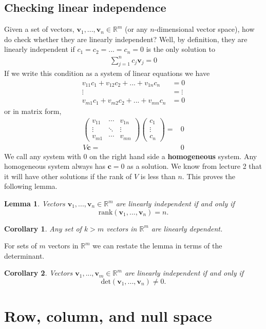 \documentclass[12pt,reqno]{amsart}
\newtheorem{corollary}{Corollary}[section]
\newtheorem{lemma}{Lemma}[section]
\theoremstyle{definition}
\def\R{\mathbb{R}}
\newcommand{\gmatrix}[1]{\begin{pmatrix} {#1}_{11} & \cdots &
    {#1}_{1n} \\ \vdots & \ddots & \vdots \\ {#1}_{m1} & \cdots &
    {#1}_{mn} \end{pmatrix}}
\renewcommand{\det}{\mathrm{det}}
\newcommand{\rank}{\mathrm{rank}}
\begin{document}
\subsection{Checking linear independence}
Given a set of vectors, $\mathbf{v}_1, ..., \mathbf{v}_n \in \R^m$ (or
any $n$-dimensional vector space), how do check whether they are
linearly independent? Well, by definition, they are linearly
independent if $c_1 = c_2 = ... = c_n = 0$ is the only solution to
\begin{align*}
  \sum_{j=1}^n c_j \mathbf{v}_j = 0 
\end{align*}
If we write this condition as a system of linear equations we have
\begin{align*}
  v_{11} c_1 + v_{12} c_2 + ... + v_{1n} c_n & = 0 \\
  \vdots & = \vdots \\
  v_{m1} c_1 + v_{m2} c_2 + ... + v_{mn} c_n & = 0 
\end{align*}
or in matrix form,
\begin{align*}
  \gmatrix{v} \begin{pmatrix} c_1 \\ \vdots \\ c_n \end{pmatrix} = &
  0 \\
  V \mathbf{c} = & 0 
\end{align*}
We call any system with $0$ on the right hand side a
\textbf{homogeneous} system. Any homogeneous system always has
$\mathbf{c}=0$ as a solution. We know from lecture 2 that it will have
other solutions if the rank of $V$ is less than $n$. This proves the
following lemma.
\begin{lemma}\label{lem:rankli}
  Vectors $\mathbf{v}_1, ..., \mathbf{v}_n \in \R^m$ are linearly
  independent if and only if
  \[ \rank(\mathbf{v}_1, ..., \mathbf{v}_n) = n. \]
\end{lemma}
\begin{corollary}\label{cor:kmli}
  Any set of $k>m$ vectors in $\R^m$ are linearly dependent.
\end{corollary}
For sets of $m$ vectors in $\R^m$ we can restate the lemma in terms of
the determinant.
\begin{corollary}\label{cor:detli}
  Vectors $\mathbf{v}_1, ..., \mathbf{v}_m \in \R^m$ are linearly
  independent if and only if
  \[ \det(\mathbf{v}_1, ..., \mathbf{v}_n) \neq 0. \]
\end{corollary}

\section{Row, column, and null space}
\end{document}
